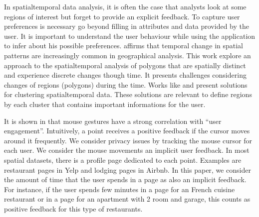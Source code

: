 \documentclass[runningheads,a4paper]{llncs}
\begin{document}

In spatialtemporal data analysis, it is often the case that analysts look at some regions of interest but forget to provide an explicit feedback. To capture user preferences is necessary go beyond filling in attributes and data provided by the user. It is important to understand the user behaviour while using the application to infer about his possible preferences. \cite{Robertson2007}  affirms that temporal change in spatial patterns are increasingly common in geographical analysis. This work explore an approach to the spatialtemporal analysis of polygons that are spatially distinct and experience discrete changes though time. It presents challenges considering changes of regions (polygons) during the time. Works like \cite{Ester:1996} and  \cite{Birant:2007} present solutions for clustering spatialtemporal data. These solutions are relevant to define regions by each cluster that contains important informations for the user. 

It is shown in \cite{Arapakis:2014} that mouse gestures have a strong correlation with ``user engagement''. Intuitively, a point receives a positive feedback if the cursor moves around it frequently. We consider privacy issues by tracking the mouse cursor for each user. We consider the mouse movements an implicit user feedback. In most spatial datasets, there is a profile page dedicated to each point. Examples are restaurant pages in Yelp and lodging pages in Airbnb. In this paper, we consider the amount of time that the user spends in a page as also an implicit feedback. For instance, if the user spends few minutes in a page for an French cuisine restaurant or in a page for an apartment with 2 room and garage, this counts as positive feedback for this type of restaurants.
\end{document}
